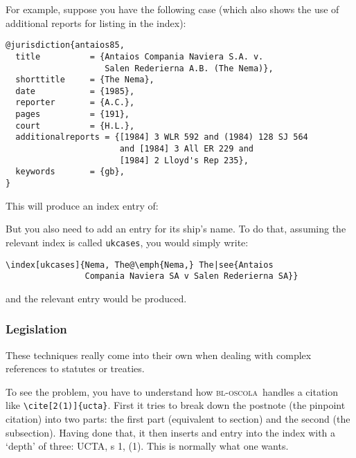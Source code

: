 \documentclass[a4paper,
               11pt,
	       DIV=1,			   
	       footinclude=false]
	      {scrartcl}
\newcommand{\oscola}{\textsc{bl-oscola}}
\newcounter{egcounter}\setcounter{egcounter}{0}
\newlength{\boxwidth}
\newenvironment{bibexample}[1][]
{%
  \medskip\par\noindent\ignorespaces
  \marginpar{[\refstepcounter{egcounter}\arabic{egcounter}]\label{#1}}%
  \setlength{\boxwidth}{0.95\linewidth}%
  \addtolength{\boxwidth}{-2\fboxsep}
  \addtolength{\boxwidth}{-2\fboxrule}
  \begin{lrbox}{\boxcontainer}
  \begin{minipage}[t]{\boxwidth}%
}
{%
  \end{minipage}\end{lrbox}%
  \colorbox{gray!30}{\usebox{\boxcontainer}}
  \par\medskip}
\begin{document}
For example, suppose you have the following case (which also
shows the use of additional reports for listing in the index):
\begin{bibexample}[antaios85]
\begin{verbatim}
@jurisdiction{antaios85,
  title          = {Antaios Compania Naviera S.A. v. 
                    Salen Rederierna A.B. (The Nema)},
  shorttitle     = {The Nema},
  date           = {1985},
  reporter       = {A.C.},
  pages          = {191},
  court          = {H.L.},
  additionalreports = {[1984] 3 WLR 592 and (1984) 128 SJ 564 
                       and [1984] 3 All ER 229 and 
                       [1984] 2 Lloyd's Rep 235},
  keywords       = {gb},
}
\end{verbatim}
\end{bibexample}

This will produce an index entry of:
\begin{quote}
\end{quote}\label{index:format}

But you also need to add an entry for its ship's name. To do that, assuming the relevant index is called \texttt{ukcases}, you would simply write:
\begin{verbatim}
\index[ukcases]{Nema, The@\emph{Nema,} The|see{Antaios 
                Compania Naviera SA v Salen Rederierna SA}}
\end{verbatim}
and the relevant entry would be produced.

\subsubsection{Legislation}

These techniques really come into their own when dealing with complex
references to statutes or treaties.

To see the problem, you have to understand how \oscola\ handles a
citation like \verb|\cite[2(1)]{ucta}|. First it tries to break down
the postnote (the pinpoint citation) into two parts: the first part
(equivalent to section) and the second (the subsection). Having done
that, it then inserts and entry into the index with a `depth' of
three: UCTA, s 1, (1). This is normally what one wants.
\end{document}
